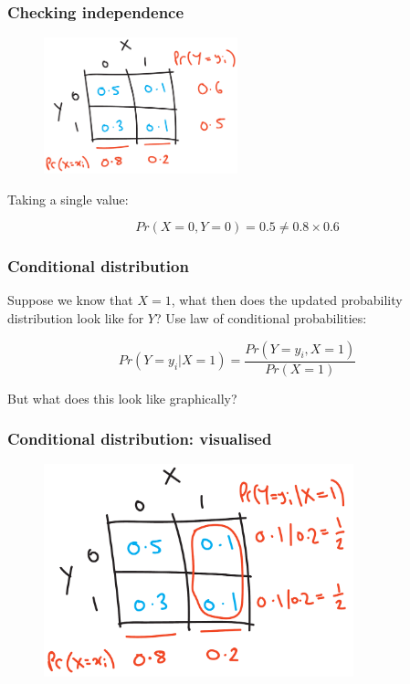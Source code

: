 \documentclass{beamer}
\begin{document}
		\begin{frame}
			\frametitle{Checking independence}
			
			\begin{figure}[ht]
				\centerline{\includegraphics[width=0.5\textwidth]{./figures/horse_race_checking_independence.pdf}}
			\end{figure}
			
			Taking a single value:
			
			\begin{equation}
			Pr(X=0, Y=0) = 0.5 \neq 0.8 \times 0.6
			\end{equation}
			
		\end{frame}
	
	\begin{frame}
		\frametitle{Conditional distribution}
		
		Suppose we know that $X=1$, what then does the updated probability distribution look like for $Y$? Use law of conditional probabilities:
		
		\begin{equation}
		Pr(Y=y_i|X=1) = \frac{Pr(Y=y_i,X=1)}{Pr(X=1)}
		\end{equation}
		
		But what does this look like graphically?
		
	\end{frame}
	
	\begin{frame}
		\frametitle{Conditional distribution: visualised}
		
		\begin{figure}[ht]
			\centerline{\includegraphics[width=0.8\textwidth]{./figures/horse_race_conditional.pdf}}
		\end{figure}
		
	\end{frame}
	
\end{document}
